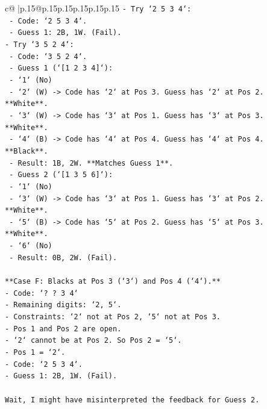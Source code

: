 \documentclass{article}
\begin{document}
{\begin{supertabular}{c@{$\;$}|p{.15\linewidth}@{}p{.15\linewidth}p{.15\linewidth}p{.15\linewidth}p{.15\linewidth}p{.15\linewidth}}
{{{\texttt{{-}   Try `2 5 3 4`:} \\
\texttt{    {-}   Code: `2 5 3 4`.} \\
\texttt{    {-}   Guess 1: 2B, 1W. (Fail).} \\
\texttt{{-}   Try `3 5 2 4`:} \\
\texttt{    {-}   Code: `3 5 2 4`.} \\
\texttt{    {-}   Guess 1 (`{[}1 2 3 4{]}`):} \\
\texttt{        {-}   `1` (No)} \\
\texttt{        {-}   `2` (W) {-}> Code has `2` at Pos 3. Guess has `2` at Pos 2. **White**.} \\
\texttt{        {-}   `3` (W) {-}> Code has `3` at Pos 1. Guess has `3` at Pos 3. **White**.} \\
\texttt{        {-}   `4` (B) {-}> Code has `4` at Pos 4. Guess has `4` at Pos 4. **Black**.} \\
\texttt{        {-}   Result: 1B, 2W. **Matches Guess 1**.} \\
\texttt{    {-}   Guess 2 (`{[}1 3 5 6{]}`):} \\
\texttt{        {-}   `1` (No)} \\
\texttt{        {-}   `3` (W) {-}> Code has `3` at Pos 1. Guess has `3` at Pos 2. **White**.} \\
\texttt{        {-}   `5` (B) {-}> Code has `5` at Pos 2. Guess has `5` at Pos 3. **White**.} \\
\texttt{        {-}   `6` (No)} \\
\texttt{        {-}   Result: 0B, 2W. (Fail).} \\
\\ 
\texttt{**Case F: Blacks at Pos 3 (`3`) and Pos 4 (`4`).**} \\
\texttt{{-}   Code: `? ? 3 4`} \\
\texttt{{-}   Remaining digits: `2, 5`.} \\
\texttt{{-}   Constraints: `2` not at Pos 2, `5` not at Pos 3.} \\
\texttt{{-}   Pos 1 and Pos 2 are open.} \\
\texttt{{-}   `2` cannot be at Pos 2. So Pos 2 = `5`.} \\
\texttt{{-}   Pos 1 = `2`.} \\
\texttt{{-}   Code: `2 5 3 4`.} \\
\texttt{{-}   Guess 1: 2B, 1W. (Fail).} \\
\\ 
\texttt{Wait, I might have misinterpreted the feedback for Guess 2.} \\
}}}
\end{supertabular}}
\end{document}
